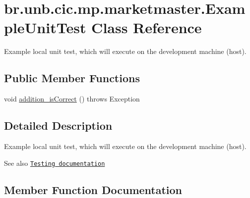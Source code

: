 \hypertarget{classbr_1_1unb_1_1cic_1_1mp_1_1marketmaster_1_1ExampleUnitTest}{}\section{br.\+unb.\+cic.\+mp.\+marketmaster.\+Example\+Unit\+Test Class Reference}
\label{classbr_1_1unb_1_1cic_1_1mp_1_1marketmaster_1_1ExampleUnitTest}


Example local unit test, which will execute on the development machine (host).  


\subsection*{Public Member Functions}
\begin{DoxyCompactItemize}
\item 
void \mbox{\hyperlink{classbr_1_1unb_1_1cic_1_1mp_1_1marketmaster_1_1ExampleUnitTest_ae78c06e45f421c5274bf426a0d90ba0b}{addition\+\_\+is\+Correct}} ()  throws Exception 
\end{DoxyCompactItemize}


\subsection{Detailed Description}
Example local unit test, which will execute on the development machine (host). 

\begin{DoxySeeAlso}{See also}
\href{http://d.android.com/tools/testing}{\tt Testing documentation} 
\end{DoxySeeAlso}


\subsection{Member Function Documentation}
\mbox{\label{classbr_1_1unb_1_1cic_1_1mp_1_1marketmaster_1_1ExampleUnitTest_ae78c06e45f421c5274bf426a0d90ba0b}} 
